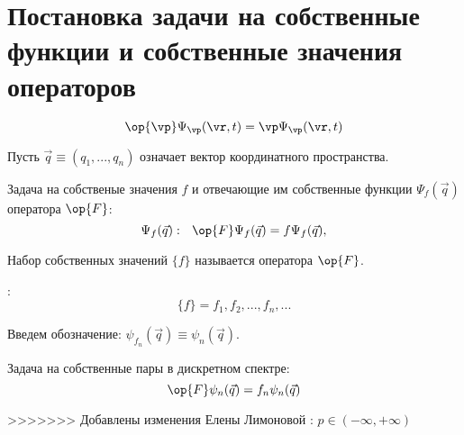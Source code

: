 \section{Постановка задачи на собственные функции и собственные значения операторов}

\begin{equation}
\label{eq:2_3_1}
\op{\vp} \Psi_\vp(\vr,t) = \vp \Psi_\vp(\vr,t)
\end{equation}

Пусть $\vec{q}\equiv(q_1,...,q_n)$ означает вектор координатного пространства.

Задача на собственые значения $f$ и отвечающие им собственные функции $\Psi_f(\vec{q})$ оператора $\op{F}$: 
\begin{equation}
\label{eq:2_3_2}
\Psi_f(\vec{q}):~~ \op{F}\Psi_f(\vec{q}) = f \Psi_f(\vec{q}), 
\end{equation}

\begin{defn}
Набор собственных значений $\{f\}$ называется  оператора $\op{F}$.
\end{defn}

:
$$\{f\} = f_1,f_2,...,f_n,... $$

Введем обозначение: $\psi_{f_n}(\vec{q}) \equiv \psi_n(\vec{q})$.

Задача на собственные пары в дискретном спектре:
\begin{equation}
\label{eq:2_3_3}
\op{F} \psi_n(\vec{q}) = f_n \psi_n(\vec{q})
\end{equation}

>>>>>>> Добавлены изменения Елены Лимоновой
: $p \in (-\infty, +\infty)$